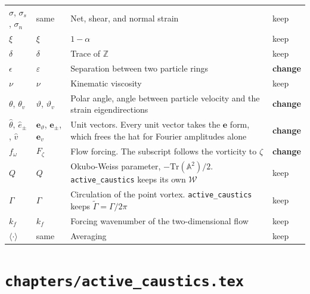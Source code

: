 \documentclass[11pt,a4paper]{article}
\newcommand{\mb}[1]{\mathbb{#1}}
\renewcommand{\vec}[1]{\boldsymbol{#1}}
\newcommand{\chg}{\textbf{change}}
\newcommand{\kp}{keep}
\begin{document}
\begin{longtable}{@{}p{3.1cm} p{3.1cm} p{8.6cm} p{1.6cm}@{}}
$\sigma$, $\sigma_s$, $\sigma_n$ & same & Net, shear, and normal strain & \kp \\
$\xi$ & $\xi$ & $1-\alpha$ & \kp \\
$\delta$ & $\delta$ & Trace of $\mb{Z}$ & \kp \\
$\epsilon$ & $\varepsilon$ & Separation between two particle rings & \chg \\
$\nu$ & $\nu$ & Kinematic viscosity & \kp \\
$\theta$, $\theta_v$ & $\vartheta$, $\vartheta_v$ & Polar angle, angle between particle velocity and the strain eigendirections & \chg \\
$\hat{\theta}$, $\hat{e}_\pm$, $\hat{v}$ & $\vec{e}_\vartheta$, $\vec{e}_\pm$, $\vec{e}_v$ & Unit vectors. Every unit vector takes the $\vec{e}$ form, which frees the hat for Fourier amplitudes alone & \chg \\
$f_\omega$ & $F_\zeta$ & Flow forcing. The subscript follows the vorticity to $\zeta$ & \chg \\
$Q$ & $Q$ & Okubo-Weiss parameter, $-\mathrm{Tr}(\mb{A}^2)/2$. \texttt{active\_caustics} keeps its own $\mathcal{W}$ & \kp \\
$\Gamma$ & $\Gamma$ & Circulation of the point vortex. \texttt{active\_caustics} keeps $\tilde{\Gamma} = \Gamma/2\pi$ & \kp \\
$k_f$ & $k_f$ & Forcing wavenumber of the two-dimensional flow & \kp \\
$\langle\cdot\rangle$ & same & Averaging & \kp \\
\bottomrule
\end{longtable}

\section*{\texttt{chapters/active\_caustics.tex}}
\end{document}
